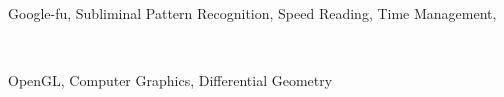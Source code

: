 \documentclass[a4paper]{MagicalCV}
\begin{document}
\begin{minipage}[t]{0.66\textwidth}
\\
Google-fu, Subliminal Pattern Recognition, Speed Reading, Time Management,
\sectionsep


 \\
\begin{tightemize}
\item  OpenGL, Computer Graphics, Differential Geometry
\end{tightemize}
\sectionsep


\end{minipage} 
\end{document}
